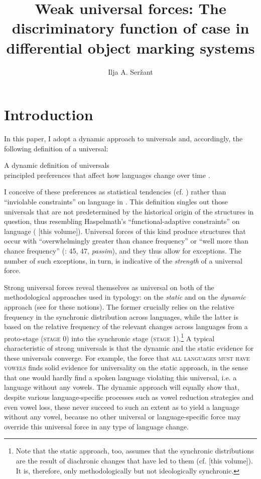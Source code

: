 \documentclass[output=paper]{langsci/langscibook}
\author{Ilja A. Seržant\affiliation{Leipzig University}}
\title{Weak universal forces: The discriminatory function of case in differential object marking systems}
\begin{document}
\maketitle 
 

\section{ Introduction}

In this paper, I adopt a dynamic approach to universals \citep{Greenberg1978} and, accordingly, the following definition of a universal:

\ea A dynamic definition of universals\\
principled preferences that affect how languages change over time \citep[401]{Bickel2011}.
\z

I conceive of these preferences as statistical tendencies (cf. \citealt{Bickel2011}) rather than “inviolable constraints” on language in \citet{Kiparsky2008}. This definition singles out those universals that are not predetermined by the historical origin of the structures in question, thus resembling Haspelmath’s “functional-adaptive constraints” on language (\citealt{Haspelmath2018} [this volume]). Universal forces of this kind produce structures that occur with “overwhelmingly greater than chance frequency” or “well more than chance frequency” (\citealt{Greenberg1963}: 45, 47, \textit{passim}), and they thus allow for exceptions. The number of such exceptions, in turn, is indicative of the \textit{strength} of a universal force. 

Strong universal forces reveal themselves as universal on both of the methodological approaches used in typology: on the \textit{static} and on the \textit{dynamic} approach (see \citealt{Greenberg1969} for these notions). The former crucially relies on the relative frequency in the synchronic distribution across languages, while the latter is based on the relative frequency of the relevant changes across languages from a proto-stage (\textsc{stage} 0) into the synchronic stage (\textsc{stage} 1).\footnote{Note that the static approach, too, assumes that the synchronic distributions are the result of diachronic changes that have led to them (cf. \citealt{Haspelmath2018} [this volume]). It is, therefore, only methodologically but not ideologically synchronic.} A typical characteristic of strong universals is that the dynamic and the static evidence for these universals converge. For example, the force that \textsc{all languages must have vowels} \citep[19]{Comrie1989} finds solid evidence for universality on the static approach, in the sense that one would hardly find a spoken language violating this universal, i.e. a language without any vowels. The dynamic approach will equally show that, despite various language-specific processes such as vowel reduction strategies and even vowel loss, these never succeed to such an extent as to yield a language without any vowel, because no other universal or language-specific force may override this universal force in any type of language change.  
\end{document}
